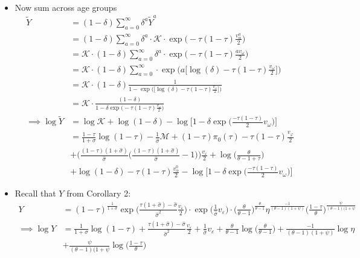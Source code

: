 \documentclass{article}
\newcommand{\M}{\mathcal{M}}
\begin{document}
\begin{itemize}
\begin{align*}
\end{align*}
\item Now sum across age groups
\begin{align*}
\tilde Y 
&= (1-\delta) \sum_{a = 0}^\infty \delta^a \tilde Y^a\\
&= (1-\delta) \sum_{a = 0}^\infty \delta^a \cdot \mathcal{K} \cdot \exp \Big(-\tau(1-\tau)\frac{v_\alpha^a}{2}\Big)\\
&= \mathcal{K} \cdot (1-\delta) \sum_{a = 0}^\infty \delta^a \cdot \exp \Big(-\tau(1-\tau)\frac{av_\omega}{2}\Big)\\
&= \mathcal{K} \cdot (1-\delta) \sum_{a = 0}^\infty \cdot \exp \Big(a \Big[\log(\delta)-\tau(1-\tau)\frac{v_\omega}{2} \Big] \Big)\\
&= \mathcal{K} \cdot (1-\delta)  \frac{1}{1-\exp \Big(\Big[\log(\delta)-\tau(1-\tau)\frac{v_\omega}{2} \Big] \Big)}\\
&= \mathcal{K} \cdot  \frac{(1-\delta) }{1-\delta\exp \Big(-\tau(1-\tau)\frac{v_\omega}{2} \Big)}\\
\implies
\log \tilde Y
&= \log \mathcal{K} + \log(1-\delta) - \log\Big[ 1 - \delta \exp\Big( \frac{-\tau(1-\tau)}{2}v_\omega \Big) \Big]\\
&= \frac{1-\tau}{1+\sigma} \log(1-\tau) -\frac{1}{\hat\sigma} \M + (1-\tau)\pi_0(\tau) -\tau(1-\tau)\frac{v_\varphi}{2} \\
& + \Big( \frac{(1-\tau)(1+\hat\sigma)}{\hat \sigma}\Big(\frac{(1-\tau)(1+\hat\sigma)}{\hat \sigma} - 1 \Big)\Big) \frac{v_\varepsilon}{2} + \log\Bigg(  \frac{\theta}{\theta - 1 + \tau}\Bigg) \\&+ \log(1-\delta) - \tau(1-\tau)\frac{v_\alpha^0}{2} - \log\Big[ 1 - \delta \exp\Big( \frac{-\tau(1-\tau)}{2}v_\omega \Big) \Big]
\end{align*}
\item Recall that $Y$ from Corollary 2:
\begin{align*}
Y &= (1-\tau)^{\frac{1}{1+\sigma}} \exp\Bigg( \frac{\tau(1+\hat\sigma) - \hat \sigma}{\hat \sigma^2}\frac{v_\varepsilon}{2}\Bigg)\cdot \exp\Bigg(\frac{1}{\hat\sigma} v_\varepsilon\Bigg)\cdot \Bigg(\frac{\theta}{\theta-1}\Bigg)^{\frac{\theta}{\theta-1}} \eta^{\frac{-1}{(\theta-1)(1+\psi)}} \Bigg( \frac{1-\tau}{\theta}\Bigg)^{\frac{\psi}{(\theta-1)(1+\psi}} \\ 
\implies
\log Y &=\frac{1}{1+\sigma} \log (1-\tau) + \frac{\tau(1+\hat\sigma) - \hat \sigma}{\hat \sigma^2}\frac{v_\varepsilon}{2} + \frac{1}{\hat\sigma} v_\varepsilon + \frac{\theta}{\theta-1}\log\Big( \frac{\theta}{\theta-1} \Big) + \frac{-1}{(\theta-1)(1+\psi)} \log \eta\\ &+ \frac{\psi}{(\theta-1)(1+\psi} \log \Big( \frac{1-\tau}{\theta} \Big)

\end{align*}
\end{itemize}
\end{document}
